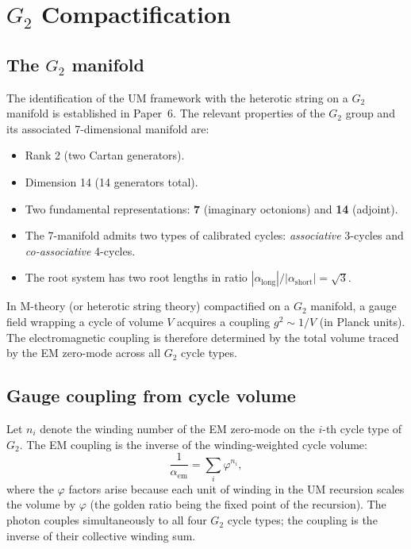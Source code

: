 \documentclass[12pt]{article}
\begin{document}
\section{$G_2$ Compactification}

\subsection{The $G_2$ manifold}

The identification of the UM framework with the heterotic string on a
$G_2$ manifold is established in Paper~6. The relevant properties of
the $G_2$ group and its associated 7-dimensional manifold are:

\begin{itemize}
  \item Rank 2 (two Cartan generators).
  \item Dimension 14 (14 generators total).
  \item Two fundamental representations: \textbf{7} (imaginary
    octonions) and \textbf{14} (adjoint).
  \item The 7-manifold admits two types of calibrated cycles:
    \emph{associative} 3-cycles and \emph{co-associative} 4-cycles.
  \item The root system has two root lengths in ratio
    $|\alpha_{\text{long}}|/|\alpha_{\text{short}}| = \sqrt{3}$.
\end{itemize}

In M-theory (or heterotic string theory) compactified on a $G_2$
manifold, a gauge field wrapping a cycle of volume $V$ acquires a
coupling $g^2 \sim 1/V$ (in Planck units). The electromagnetic
coupling is therefore determined by the total volume traced by the EM
zero-mode across all $G_2$ cycle types.

\subsection{Gauge coupling from cycle volume}

Let $n_i$ denote the winding number of the EM zero-mode on the $i$-th
cycle type of $G_2$. The EM coupling is the inverse of the
winding-weighted cycle volume:
\begin{equation}
  \frac{1}{\alpha_{\text{em}}}
  = \sum_i \varphi^{n_i},
  \label{eq:winding_sum}
\end{equation}
where the $\varphi$ factors arise because each unit of winding in the
UM recursion scales the volume by $\varphi$ (the golden ratio being the
fixed point of the recursion). The photon couples simultaneously to all
four $G_2$ cycle types; the coupling is the inverse of their collective
winding sum.
\end{document}
